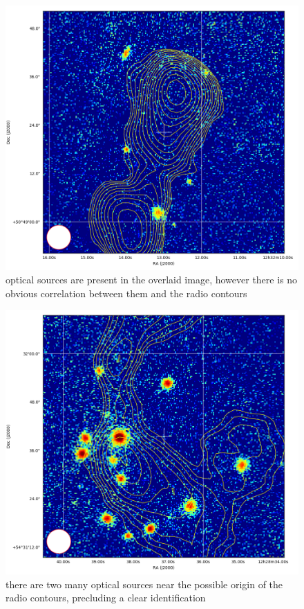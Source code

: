 \documentclass{article}
\begin{document}
\begin{figure}
    \centering
    \includegraphics[scale = 0.5]{bad2.png}
    \caption{optical sources are present in the overlaid image, however there is no obvious correlation between them and the radio contours}
\end{figure}

\begin{figure}
    \centering
    \includegraphics[scale = 0.5]{bad3.png}
    \caption{there are two many optical sources near the possible origin of the radio contours, precluding a clear identification}
\end{figure}
\end{document}
